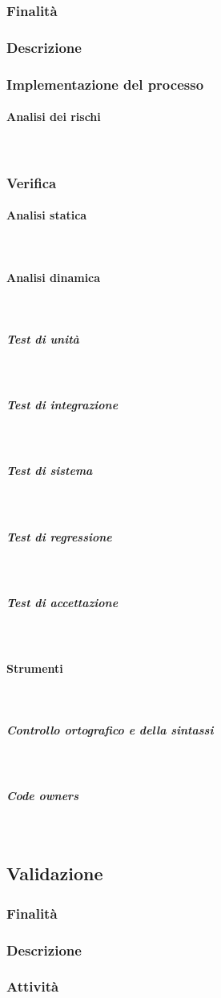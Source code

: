 \documentclass[../norme-di-progetto.tex]{subfiles}
\begin{document}
\subsubsection{Finalità}
\subsubsection{Descrizione}
\subsubsection{Implementazione del processo}
\paragraph{Analisi dei rischi}\mbox{}\\
\subsubsection{Verifica}
\paragraph{Analisi statica}\mbox{}\\
\paragraph{Analisi dinamica}\mbox{}\\
\subparagraph{Test di unità}\mbox{}\\
\subparagraph{Test di integrazione}\mbox{}\\
\subparagraph{Test di sistema}\mbox{}\\
\subparagraph{Test di regressione}\mbox{}\\
\subparagraph{Test di accettazione}\mbox{}\\
\paragraph{Strumenti}\mbox{}\\
\subparagraph{Controllo ortografico e della sintassi}\mbox{}\\
\subparagraph{Code owners}\mbox{}\\
\subsection{Validazione}
\subsubsection{Finalità}
\subsubsection{Descrizione}
\subsubsection{Attività}
\end{document}
